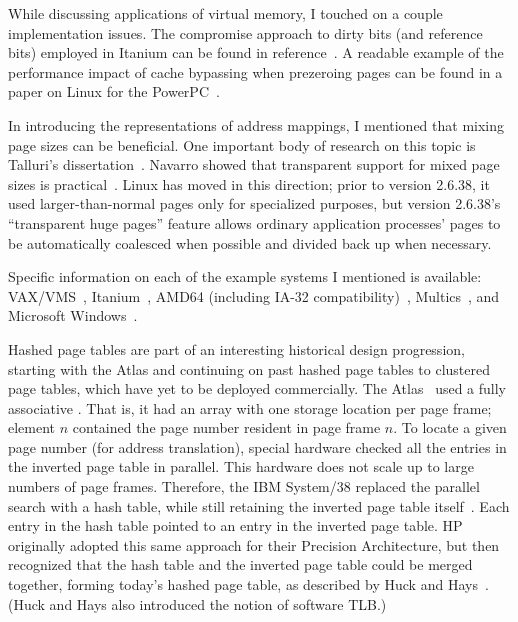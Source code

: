 While discussing applications of virtual memory, I touched on a
couple implementation issues.  The compromise approach to dirty bits
(and reference bits) employed in Itanium can be found in reference~\cite{max1064}.
A readable example of the performance impact of cache bypassing when
prezeroing pages can be found in a paper on Linux for the
PowerPC~\cite{max1061}.

In introducing the representations of address mappings, I mentioned
that mixing page sizes can be beneficial.  One important body of
research on this topic is Talluri's dissertation~\cite{max1077}.
Navarro showed that transparent support for mixed page sizes is practical~\cite{max1193}.
Linux has moved in this direction; prior to version 2.6.38, it used
larger-than-normal pages only for specialized purposes, but version 2.6.38's ``transparent huge pages'' feature
allows ordinary application processes' pages to be automatically coalesced when possible and divided back up when necessary.

Specific information on each of the example systems I mentioned is
available: VAX/VMS~\cite{max1067}, Itanium~\cite{max1064}, AMD64
(including IA-32 compatibility)~\cite{max1065},
Multics~\cite{max1068,max1036}, and Microsoft
Windows~\cite{max981}.

Hashed page tables are part of an interesting historical design
progression, starting with the Atlas and continuing on past hashed
page tables to clustered page tables, which have yet to be deployed
commercially.
The Atlas~\cite{max1052,max1053} used a fully associative
.  That is, it had an array with one storage
location per page frame; element $n$ contained the page number
resident in page frame $n$.  To locate a given page number (for
address translation), special hardware checked all the entries in the
inverted page table in parallel.  This hardware does not scale up to
large numbers of page frames.  Therefore, the IBM
System/38
replaced the parallel search with a hash table, while still retaining
the inverted page table itself~\cite{max1080}.  Each entry in the hash table pointed
to an entry in the inverted page table.  HP originally adopted this
same approach for their Precision Architecture, but then recognized
that the hash table and the inverted page table could be merged
together, forming today's hashed page table, as described by
Huck and
Hays~\cite{max1070}.  (Huck and Hays also introduced the notion of
software TLB.)

